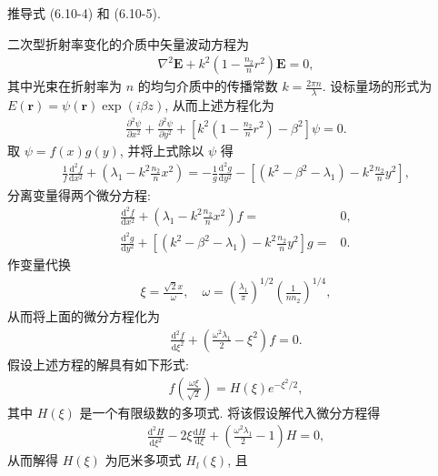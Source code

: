 \documentclass[twoside]{note}
\begin{document}
\begin{exe}
    推导式 (6.10-4) 和 (6.10-5).
\end{exe}
\begin{pf}
    二次型折射率变化的介质中矢量波动方程为
    \begin{align}
        \nabla^2\bm{E}+k^2\left(1-\frac{n_2}{n}r^2\right)\bm{E}=0,
    \end{align}
    其中光束在折射率为 $n$ 的均匀介质中的传播常数 $k=\frac{2\pi n}{\lambda}$.
    设标量场的形式为 $E(\bm{r})=\psi(\bm{r})\exp(i\beta z)$, 从而上述方程化为
    \begin{align}
        \frac{\partial^2\psi}{\partial x^2}+\frac{\partial^2\psi}{\partial y^2}+\left[k^2\left(1-\frac{n_2}{n}r^2\right)-\beta^2\right]\psi=0.
    \end{align}
    取 $\psi=f(x)g(y)$, 并将上式除以 $\psi$ 得
    \begin{align}
        \frac{1}{f}\frac{\mathrm{d}^2f}{\mathrm{d}x^2}+\left(\lambda_1-k^2\frac{n_2}{n}x^2\right)=-\frac{1}{g}\frac{\mathrm{d}^2g}{\mathrm{d}y^2}-\left[(k^2-\beta^2-\lambda_1)-k^2\frac{n_2}{n}y^2\right],
    \end{align}
    分离变量得两个微分方程:
    \begin{align}
        \frac{\mathrm{d}^2f}{\mathrm{d}x^2}+\left(\lambda_1-k^2\frac{n_2}{n}x^2\right)f=&0,\\
        \frac{\mathrm{d}^2g}{\mathrm{d}y^2}+\left[(k^2-\beta^2-\lambda_1)-k^2\frac{n_2}{n}y^2\right]g=&0.
    \end{align}
    作变量代换
    \begin{align}
        \xi=\frac{\sqrt{2}x}{\omega},\quad\omega=\left(\frac{\lambda_1}{\pi}\right)^{1/2}\left(\frac{1}{nn_2}\right)^{1/4},
    \end{align}
    从而将上面的微分方程化为
    \begin{align}
        \frac{\mathrm{d}^2f}{\mathrm{d}\xi^2}+\left(\frac{\omega^2\lambda_1}{2}-\xi^2\right)f=0.
    \end{align}
    假设上述方程的解具有如下形式:
    \begin{align}
        f\left(\frac{\omega\xi}{\sqrt{2}}\right)=H(\xi)e^{-\xi^2/2},
    \end{align}
    其中 $H(\xi)$ 是一个有限级数的多项式.
    将该假设解代入微分方程得
    \begin{align}
        \frac{\mathrm{d}^2H}{\mathrm{d}\xi^2}-2\xi\frac{\mathrm{d}H}{\mathrm{d}\xi}+\left(\frac{\omega^2\lambda_1}{2}-1\right)H=0,
    \end{align}
    从而解得 $H(\xi)$ 为厄米多项式 $H_l(\xi)$, 且

\end{pf}
\end{document}
